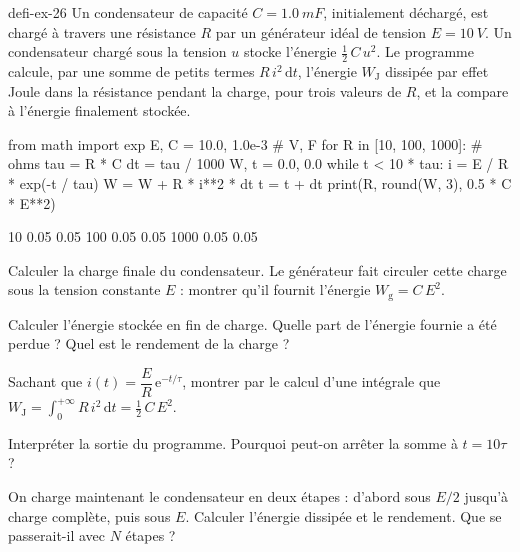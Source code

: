 \begin{blocEdition}{defi-ex-26}
Un condensateur de capacité $C=\qty{1,0}{mF}$, initialement déchargé, est chargé à travers une résistance $R$ par un
générateur idéal de tension $E=\qty{10}{V}$. Un condensateur chargé sous la tension $u$ stocke l'énergie $\frac12\,C\,u^2$. Le
programme calcule, par une somme de petits termes $R\,i^2\,\mathrm{d}t$, l'énergie $W_\mathrm{J}$ dissipée par effet Joule dans la
résistance pendant la charge, pour trois valeurs de $R$, et la compare à l'énergie finalement stockée.
\begin{codecote}[0.66]
\begin{pythoncol}
from math import exp
E, C = 10.0, 1.0e-3               # V, F
for R in [10, 100, 1000]:         # ohms
    tau = R * C
    dt = tau / 1000
    W, t = 0.0, 0.0
    while t < 10 * tau:
        i = E / R * exp(-t / tau)
        W = W + R * i**2 * dt
        t = t + dt
    print(R, round(W, 3), 0.5 * C * E**2)
\end{pythoncol}
\cote
\begin{consolecol}
10 0.05 0.05
100 0.05 0.05
1000 0.05 0.05
\end{consolecol}
\end{codecote}
\par\smallskip
\begin{questions}
\item Calculer la charge finale du condensateur. Le générateur fait circuler cette charge sous la tension constante $E$ :
montrer qu'il fournit l'énergie $W_\mathrm{g}=C\,E^2$.
\item Calculer l'énergie stockée en fin de charge. Quelle part de l'énergie fournie a été perdue ? Quel est le rendement de
la charge ?
\item Sachant que $i(t)=\dfrac{E}{R}\,\mathrm{e}^{-t/\tau}$, montrer par le calcul d'une intégrale que $W_\mathrm{J}=\displaystyle\int_0^{+\infty}R\,i^2\,\mathrm{d}t=\frac12\,C\,E^2$.
\item Interpréter la sortie du programme. Pourquoi peut-on arrêter la somme à $t=10\tau$ ?
\item On charge maintenant le condensateur en deux étapes : d'abord sous $E/2$ jusqu'à charge complète, puis sous $E$.
Calculer l'énergie dissipée et le rendement. Que se passerait-il avec $N$ étapes ?
\end{questions}
\end{blocEdition}

